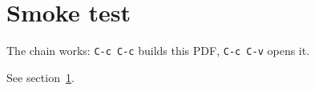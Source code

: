 \documentclass[a4paper,11pt]{article}
\begin{document}
\section{Smoke test}
\label{sec:smoke}

The chain works: \texttt{C-c C-c} builds this PDF, \texttt{C-c C-v} opens it.

See section~\ref{sec:smoke}.
\end{document}
